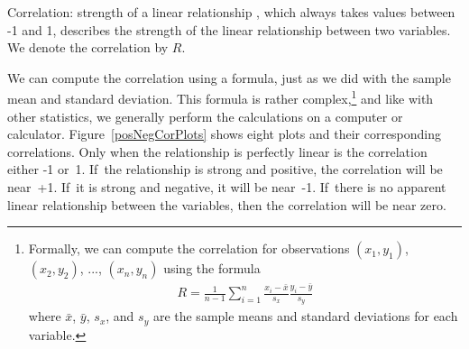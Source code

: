 \begin{onebox}{Correlation: strength of a linear relationship}
  , which always takes values
  between -1 and 1, describes the strength of the linear
  relationship between two variables.
  We denote the correlation by $R$.
\end{onebox}

We can compute the correlation using a formula, just as we did
with the sample mean and standard deviation.
This formula is rather complex,\footnote{Formally,
  we can compute the correlation for observations $(x_1, y_1)$,
  $(x_2, y_2)$, ..., $(x_n, y_n)$ using the formula
  \begin{align*}
  R = \frac{1}{n-1}
      \sum_{i=1}^{n} \frac{x_i-\bar{x}}{s_x}\frac{y_i-\bar{y}}{s_y}
  \end{align*}
  where $\bar{x}$, $\bar{y}$, $s_x$, and $s_y$ are the sample
  means and standard deviations for each variable.}
and like with other statistics, we generally perform the
calculations on a computer or calculator.
Figure~\ref{posNegCorPlots} shows eight plots and their
corresponding correlations.
Only when the relationship is perfectly linear is the
correlation either -1 or~1.
If~the relationship is strong and positive, the correlation
will be near~+1.
If~it is strong and negative, it will be near~-1.
If~there is no apparent linear relationship between the
variables, then the correlation will be near zero.

